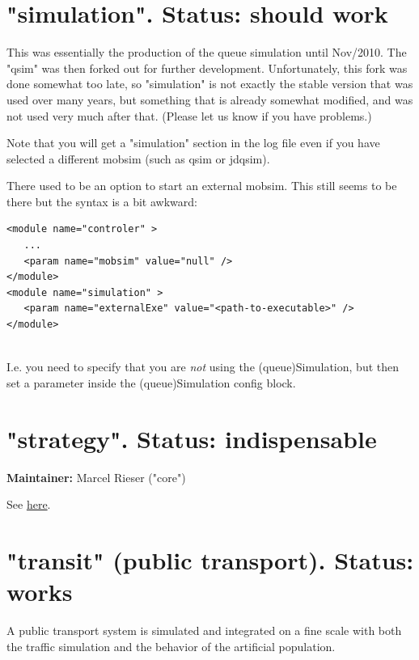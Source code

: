 
\vfill\eject
\section{"simulation". Status: should work}

This  was essentially the production of the queue simulation until Nov/2010.  The "qsim" was then forked out for further development. Unfortunately,  this fork was done somewhat too late, so "simulation" is not exactly the  stable version that was used over many years, but something that is  already somewhat modified, and was not used very much after that.  (Please let us know if you have problems.)

Note that you will get a "simulation" section in the log file even if  you have selected a different mobsim (such as qsim or jdqsim).

There used to be an option to start an external mobsim. This still seems to be there but the syntax is a bit awkward:
\begin{verbatim}
<module name="controler" >
   ...
   <param name="mobsim" value="null" />
</module>
<module name="simulation" >
   <param name="externalExe" value="<path-to-executable>" />
</module>


\end{verbatim}

I.e. you need to specify that you are \emph{not} using the (queue)Simulation, but then set a parameter inside the (queue)Simulation config block.

\vfill\eject
\section{"strategy". Status: indispensable}

\textbf{Maintainer:} Marcel Rieser ("core")

See \href{http://matsim.org/node/478}{here}.

\vfill\eject
\section{"transit" (public transport).  Status: works}

A  public transport system is simulated and integrated on a fine scale  with both the traffic simulation and the behavior of the artificial  population.

